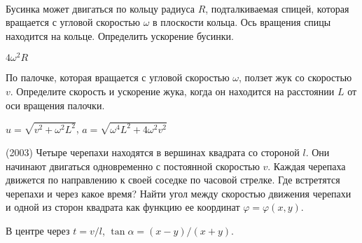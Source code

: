 \begin{samepage}
\begin{ex}
\hspace{0pt} \\
\begin{minipage}{.65\textwidth}
Бусинка может двигаться по кольцу радиуса $R$, подталкиваемая спицей, которая вращается с угловой скоростью $\omega$ в плоскости кольца. Ось вращения спицы находится на кольце. Определить ускорение бусинки.
\end{minipage}
\begin{minipage}{.35\textwidth}
\centering

\end{minipage}
\begin{ans}
$4 \omega^2 R$
\end{ans}
\end{ex}
\end{samepage}

\begin{ex}
По палочке, которая вращается с угловой скоростью $\omega$, ползет жук со скоростью $v$. Определите скорость и ускорение жука, когда он находится на расстоянии $L$ от оси вращения палочки.
\begin{ans}
$u = \sqrt{v^2 + \omega^2 L^2}$, $a = \sqrt{\omega^4 L^2 + 4\omega^2 v^2}$
\end{ans}
\end{ex}

\begin{ex}
(2003) Четыре черепахи находятся в вершинах квадрата со стороной $l$. Они начинают двигаться одновременно с постоянной скоростью $v$. Каждая черепаха движется по направлению к своей соседке по часовой стрелке. Где встретятся черепахи и через какое время? Найти угол между скоростью движения черепахи и одной из сторон квадрата как функцию ее координат $\varphi = \varphi (x,y)$.
\begin{ans}
В центре через $t = v/l$, $\tan \alpha = (x-y)/(x+y)$.
\end{ans}
\end{ex}